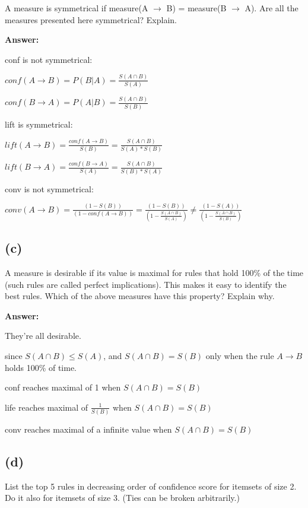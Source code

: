 \documentclass{article}
\begin{document}
A measure is symmetrical if measure(A $\rightarrow$ B) = measure(B $\rightarrow$ A). Are all the measures
presented here symmetrical? Explain.

\textbf{Answer:}

conf is not symmetrical:

$conf(A \rightarrow B) = P(B | A) = \frac{S(A \cap B)}{S(A)}$

$conf(B \rightarrow A) = P(A | B) = \frac{S(A \cap B)}{S(B)}$


lift is symmetrical:

$lift(A \rightarrow B) = \frac{conf(A \rightarrow B)}{S(B)} = \frac{S(A \cap B)}{S(A) * S(B)}$

$lift(B \rightarrow A) = \frac{conf(B \rightarrow A)}{S(A)} = \frac{S(A \cap B)}{S(B) * S(A)}$


conv is not symmetrical:

$conv(A \rightarrow B) = \frac{(1 - S(B))}{(1 - conf(A \rightarrow B))} = \frac{(1 - S(B))}{(1 - \frac{S(A \cap B)}{S(A)})} \ne \frac{(1 - S(A))}{(1 - \frac{S(A \cap B)}{S(B)})}$



\subsection{(c)}

A measure is desirable if its value is maximal for rules that hold 100\% of the time (such rules
are called perfect implications). This makes it easy to identify the best rules. Which of the
above measures have this property? Explain why.

\textbf{Answer:}

They're all desirable.

since $S(A \cap B) \le S(A)$, and $S(A \cap B) = S(B)$ only when the rule $A \rightarrow B$ holds 100\% of time.

conf reaches maximal of 1 when  $S(A \cap B) = S(B)$

life reaches maximal of $\frac{1}{S(B)}$ when  $S(A \cap B) = S(B)$

conv reaches maximal of a infinite value when  $S(A \cap B) = S(B)$




\subsection{(d)}

List the top 5 rules in decreasing order of confidence score for itemsets of size 2. Do it also
for itemsets of size 3. (Ties can be broken arbitrarily.)
\end{document}
